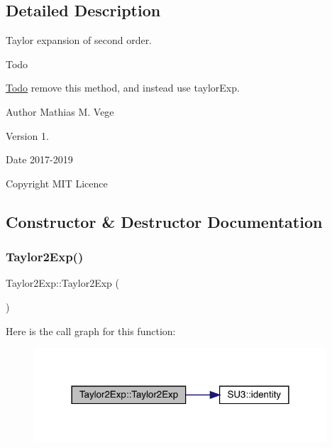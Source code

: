 \subsection{Detailed Description}
Taylor expansion of second order. 

\begin{DoxyRefDesc}{Todo}
\item[\mbox{\hyperlink{todo__todo000002}{Todo}}]remove this method, and instead use taylor\+Exp.\end{DoxyRefDesc}


\begin{DoxyAuthor}{Author}
Mathias M. Vege 
\end{DoxyAuthor}
\begin{DoxyVersion}{Version}
1. 
\end{DoxyVersion}
\begin{DoxyDate}{Date}
2017-\/2019 
\end{DoxyDate}
\begin{DoxyCopyright}{Copyright}
M\+IT Licence 
\end{DoxyCopyright}


\subsection{Constructor \& Destructor Documentation}
\mbox{\label{class_taylor2_exp_ac3b48be4c567e163f7baaa041121a93f}} 
\subsubsection{\texorpdfstring{Taylor2Exp()}{Taylor2Exp()}}
{\footnotesize\ttfamily Taylor2\+Exp\+::\+Taylor2\+Exp (\begin{DoxyParamCaption}{ }\end{DoxyParamCaption})}

Here is the call graph for this function\+:\nopagebreak
\begin{figure}[H]
\begin{center}
\leavevmode
\includegraphics[width=309pt]{class_taylor2_exp_ac3b48be4c567e163f7baaa041121a93f_cgraph}
\end{center}
\end{figure}


